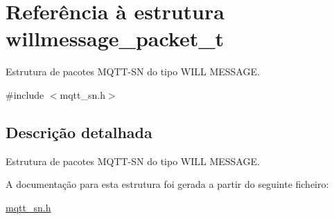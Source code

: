 \hypertarget{structwillmessage__packet__t}{\section{Referência à estrutura willmessage\+\_\+packet\+\_\+t}
\label{structwillmessage__packet__t}
}


Estrutura de pacotes M\+Q\+T\+T-\/\+S\+N do tipo W\+I\+L\+L M\+E\+S\+S\+A\+G\+E.  




{\ttfamily \#include $<$mqtt\+\_\+sn.\+h$>$}



\subsection{Descrição detalhada}
Estrutura de pacotes M\+Q\+T\+T-\/\+S\+N do tipo W\+I\+L\+L M\+E\+S\+S\+A\+G\+E. 

A documentação para esta estrutura foi gerada a partir do seguinte ficheiro\+:\begin{DoxyCompactItemize}
\item 
\hyperlink{mqtt__sn_8h}{mqtt\+\_\+sn.\+h}\end{DoxyCompactItemize}
